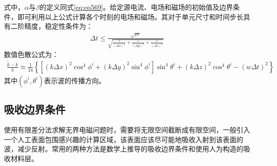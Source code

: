 \documentclass{article}
\numberwithin{equation}{section}
\begin{document}
式中，$\alpha$与$\beta$的定义同式\ref{eq:eq569}。给定源电流、电场和磁场的初始值及边界条件，即可利用以上公式计算各个时刻的电场和磁场。其对于单元尺寸和时间步长具有二阶精度，稳定性条件为：
\begin{align}
    \label{eq:eq584}
    \Delta t\leq\frac{\sqrt{\mu\epsilon}}{\sqrt{\frac{1}{(\Delta x)^2}+\frac{1}{(\Delta y)^2}+\frac{1}{(\Delta z)^2}}}
\end{align}
数值色散公式为：
\begin{align}
    \label{eq:eq585}
    \frac{\tilde{k}-k}{k}\approx\frac{1}{24}\left\{\left[(k\Delta x)^2\cos^4\phi^i+(k\Delta y)^2\sin^4\phi^i\right]\sin^4\theta^i+(k\Delta z)^2\cos^4\theta^i-(w\Delta t)^2\right\}
\end{align}
其中$(\phi^i,\theta^i)$表示波的传播方向。
\subsection{吸收边界条件}
使用有限差分法求解无界电磁问题时，需要将无限空间截断成有限空间，一般引入一个人工表面包围感兴趣的计算区域，该表面应该尽可能地吸收入射到该表面的波，减少反射。常用的两种方法是数学上推导的吸收边界条件和使用人为构造的吸收材料层。
\end{document}
